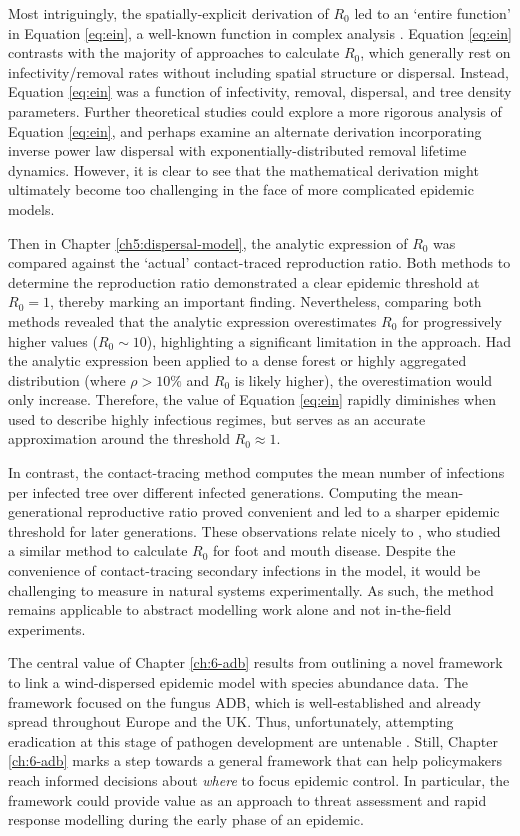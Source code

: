 Most intriguingly, the spatially-explicit derivation of $R_0$ led to an `entire function' in Equation \ref{eq:ein}, a well-known function in complex analysis  \cite{abramowitz1948handbook}. 
Equation \ref{eq:ein} contrasts with the majority of approaches to calculate $R_0$, which generally rest on infectivity/removal rates without including spatial structure or dispersal. Instead, Equation \ref{eq:ein} was a function of infectivity, removal, dispersal, and tree density parameters. Further theoretical studies could explore a more rigorous analysis of Equation \ref{eq:ein}, and perhaps examine an alternate derivation incorporating inverse power law dispersal with exponentially-distributed removal lifetime dynamics.
However, it is clear to see that the mathematical derivation might ultimately become too challenging in the face of more complicated epidemic models. 

Then in Chapter \ref{ch5:dispersal-model}, the analytic expression of $R_0$ was compared against the `actual' contact-traced reproduction ratio. Both methods to determine the reproduction ratio demonstrated a clear epidemic threshold at $R_0=1$, thereby marking an important finding. Nevertheless, comparing both methods revealed that the analytic expression overestimates $R_0$ for progressively higher values ($R_0 \sim 10$), highlighting a significant limitation in the approach. 
Had the analytic expression been applied to a dense forest or highly aggregated distribution (where $\rho >10\%$ and $R_0$ is likely higher), the overestimation would only increase.
Therefore, the value of Equation \ref{eq:ein} rapidly diminishes when used to describe highly infectious regimes, but serves as an accurate approximation around the threshold $R_0 \approx 1$.

In contrast, the contact-tracing method computes the mean number of infections per infected tree over different infected generations.
Computing the mean-generational reproductive ratio proved convenient and led to a sharper epidemic threshold for later generations. These observations relate nicely to \cite{R0-perc-ref}, who studied a similar method to calculate $R_0$ for foot and mouth disease.
Despite the convenience of contact-tracing secondary infections in the model, it would be challenging to measure in natural systems experimentally.
As such, the method remains applicable to abstract modelling work alone and not in-the-field experiments.

The central value of Chapter \ref{ch:6-adb} results from outlining a novel framework to link a wind-dispersed epidemic model with species abundance data. 
The framework focused on the fungus ADB, which is well-established and already spread throughout Europe and the UK.
Thus, unfortunately, attempting eradication at this stage of pathogen development are untenable \cite{ash-dieback-costs}. 
Still, Chapter \ref{ch:6-adb} marks a step towards a general framework that can help policymakers reach informed decisions about \textit{where} to focus epidemic control.
In particular, the framework could provide value as an approach to threat assessment and rapid response modelling during the early phase of an epidemic.

